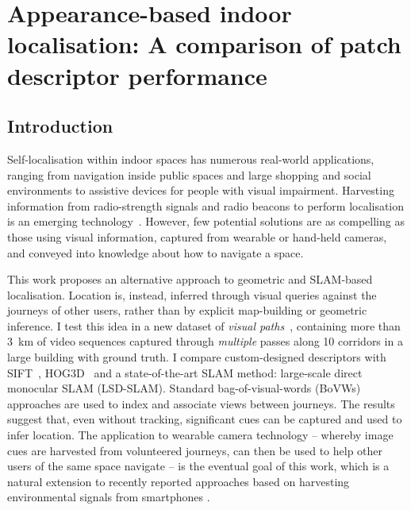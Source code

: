 \chapter{Appearance-based indoor localisation: A comparison of patch descriptor performance}\label{ch:chapter4} 

\section{Introduction}
\label{sec:intro}

Self-localisation within indoor spaces has numerous real-world applications, ranging from navigation inside public spaces and large shopping and social environments to assistive devices for people with visual impairment.   Harvesting information from radio-strength signals and radio beacons to perform localisation is an emerging technology~\cite{wang2012no,fallah2013indoor}.  However, few potential solutions are as compelling as those using  visual information,  captured from wearable or hand-held cameras, and conveyed into knowledge about how to navigate a space. 

This work proposes an alternative approach to geometric and SLAM-based localisation.  Location is, instead, inferred through visual queries against the journeys of other users, rather than by explicit map-building or geometric inference. 
I test this idea  in a new dataset of \emph{visual paths}~\cite{Rivera-Rubio2014}, containing  more than \SI{3}{km} of video sequences captured through {\em multiple} passes along 10 corridors  in a large building with ground truth. I compare custom-designed descriptors  with SIFT~\cite{Lowe2004}, HOG3D~\cite{Klaser2008} and a state-of-the-art SLAM method: large-scale direct monocular SLAM (LSD-SLAM).  Standard bag-of-visual-words (BoVWs) a\-pproach\-es are used to index and associate views between journeys. The results suggest that, even without tracking, significant cues can be captured and used to infer location.  The application to wearable camera technology -- whereby image cues are harvested from volunteered journeys, can then be used to help other users of the same space navigate -- is the eventual goal of this work, which is a natural extension to recently reported approaches based on harvesting environmental signals from smartphones \cite{Wang2012}.



